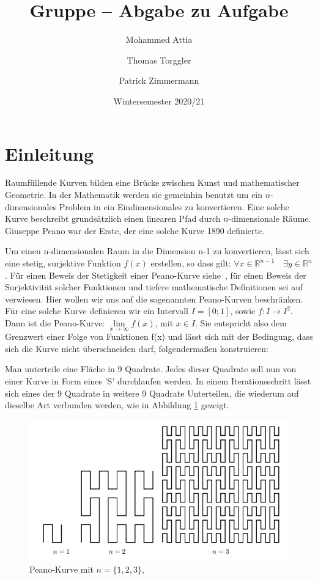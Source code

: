 \documentclass[course=asp]{aspdoc}
\author{Mohammed Attia \and Thomas Torggler \and Patrick Zimmermann}
\date{Wintersemester 2020/21} %
\title{Gruppe \theGroup{} -- Abgabe zu Aufgabe \theNumber}
\begin{document}
\maketitle

\newpage
\section{Einleitung} \label{Einleitung}

Raumf\"ullende Kurven bilden eine Br\"ucke zwischen Kunst und mathematischer Geometrie. In der Mathematik werden sie gemeinhin benutzt um ein $n$-dimensionales Problem in ein Eindimensionales zu konvertieren. Eine solche Kurve beschreibt grunds\"atzlich einen linearen Pfad durch $n$-dimensionale R\"aume. Giuseppe Peano war der Erste, der eine solche Kurve 1890 definierte.

Um einen n-dimensionalen Raum in die Dimension n-1 zu konvertieren, l\"asst sich eine stetig, surjektive Funktion $f(x)$ erstellen, so dass gilt: $\forall x \in \mathbb{R}^{n-1} \quad \exists y \in \mathbb{R}^n$. F\"ur einen Beweis der Stetigkeit einer Peano-Kurve siehe~\cite{stetigkeitsBeweis}, f\"ur einen Beweis der Surjektivit\"at solcher Funktionen und tiefere mathematische Definitionen sei auf ~\cite{surjektivBeweis} verwiesen. Hier wollen wir uns auf die sogenannten Peano-Kurven beschr\"anken. F\"ur eine solche Kurve definieren wir ein Intervall $I = [0;1]$, sowie  $f: I \rightarrow I^2 $. Dann ist die Peano-Kurve: $\lim\limits_{x \to \infty}f(x)$, mit $x \in I$. Sie entspricht also dem Grenzwert einer Folge von Funktionen f(x) und l\"asst sich mit der Bedingung, dass sich die Kurve nicht \"uberschneiden darf, folgenderma\ss en konstruieren:

Man unterteile eine Fl\"ache in 9 Quadrate. Jedes dieser Quadrate soll nun von einer Kurve in Form eines 'S' durchlaufen werden.
In einem Iterationsschritt l\"asst sich eines der 9 Quadrate in weitere 9 Quadrate Unterteilen, die wiederum auf dieselbe Art verbunden werden, wie in Abbildung \ref{Abb:Peano} gezeigt.

\begin{figure} [ht] %
\centering
\includegraphics[scale=0.9]{PeanoBsp.png}
\caption{Peano-Kurve mit $n = \{1, 2, 3\}$, ~\cite{aufgabenstellung}}\label{Abb:Peano}
\end{figure}
\end{document}
